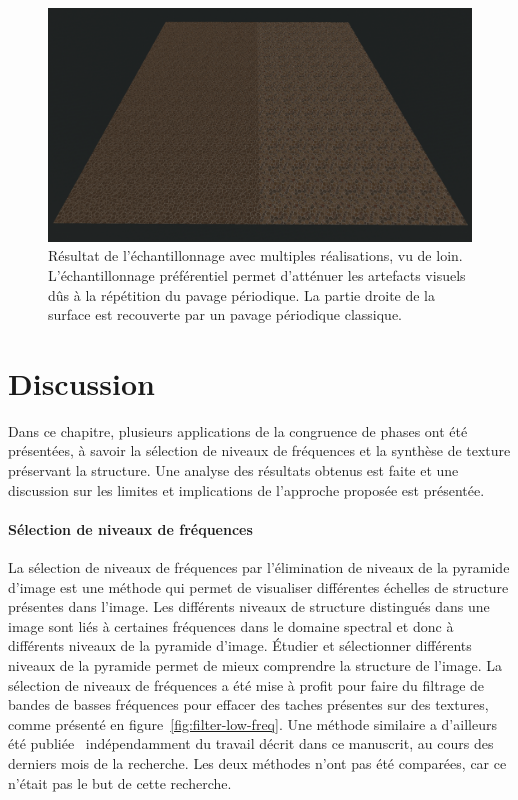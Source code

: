 \begin{figure}[t]
    \centering
    \includegraphics[width=\textwidth]{contenu/resources/images/partitioned_sampling_pc_preserving_shuffle_uv_far}
    \caption[Résultat de l'échantillonnage avec multiples réalisations, vu de loin]{Résultat de l'échantillonnage avec multiples réalisations, vu de loin. L'échantillonnage préférentiel permet d'atténuer les artefacts visuels dûs à la répétition du pavage périodique. La partie droite de la surface est recouverte par un pavage périodique classique.}
    \label{fig:pc-preserving-synthesis}
\end{figure}

\section{Discussion}

Dans ce chapitre, plusieurs applications de la congruence de phases ont été présentées, à savoir la sélection de niveaux de fréquences et la synthèse de texture préservant la structure. Une analyse des résultats obtenus est faite et une discussion sur les limites et implications de l'approche proposée est présentée.

\paragraph{Sélection de niveaux de fréquences}

La sélection de niveaux de fréquences par l'élimination de niveaux de la pyramide d'image est une méthode qui permet de visualiser différentes échelles de structure présentes dans l'image. Les différents niveaux de structure distingués dans une image sont liés à certaines fréquences dans le domaine spectral et donc à différents niveaux de la pyramide d'image. Étudier et sélectionner différents niveaux de la pyramide permet de mieux comprendre la structure de l'image. La sélection de niveaux de fréquences a été mise à profit pour faire du filtrage de bandes de basses fréquences pour effacer des taches présentes sur des textures, comme présenté en figure~\ref{fig:filter-low-freq}. Une méthode similaire a d'ailleurs été publiée~\cite{zhang_pyramid_2023} indépendamment du travail décrit dans ce manuscrit, au cours des derniers mois de la recherche. Les deux méthodes n'ont pas été comparées, car ce n'était pas le but de cette recherche.

